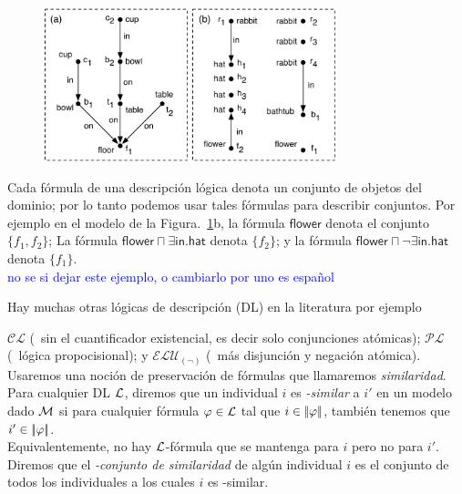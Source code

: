 \begin{figure}[ht]
\begin{center}
\includegraphics[width=8.5cm]{figures/pic-dale-haddock.pdf}\\[0pt]
\caption{}
\label{fig:dale-haddock}
\end{center}
\end{figure}


Cada f\'ormula de una descripci\'on l\'ogica denota un conjunto de objetos del dominio; por lo tanto podemos usar tales f\'ormulas para describir conjuntos. Por ejemplo en el modelo de la Figura.~\ref{fig:dale-haddock}b, la f\'ormula
$\mathsf{flower}$ denota el conjunto $\{f_1,f_2\}$; La f\'ormula
$\mathsf{flower} \sqcap \exists \mathsf{in}.\mathsf{hat}$ denota
$\{f_2\}$; y la f\'ormula $\mathsf{flower} \sqcap \neg
\exists \mathsf{in}.\mathsf{hat}$ denota $\{f_1\}$.\\

\textcolor{blue}{no se si dejar este ejemplo, o cambiarlo por uno es espa\~nol}

Hay muchas otras l\'ogicas de descripci\'on (DL) en la literatura por ejemplo 

$\mathcal{CL}$ (\el\ sin el cuantificador existencial, es decir solo conjunciones at\'omicas); $\mathcal{PL}$ (\alc\ l\'ogica propocisional); y
$\mathcal{ELU}_{(\neg)}$ (\el\ m\'as disjunci\'on y negaci\'on at\'omica).\\

Usaremos una noci\'on de preservaci\'on de f\'ormulas que llamaremos
\emph{similaridad}. Para cualquier DL $\mathcal{L}$, diremos que un individual $i$ es \emph{\gL-similar} a $i'$ en un modelo dado $\mathcal{M}$
si para cualquier f\'ormula $\varphi \in \mathcal{L}$ tal que $i \in
|\!|\varphi|\!|$, tambi\'en tenemos que $i' \in |\!|\varphi|\!|$.\\
Equivalentemente, no hay $\mathcal{L}$-f\'ormula que se mantenga para $i$ pero no para
$i'$.  Diremos que el \emph{\gL-conjunto de similaridad} de alg\'un individual
$i$ es el conjunto de todos los individuales a los cuales $i$ es \gL-similar.\\

